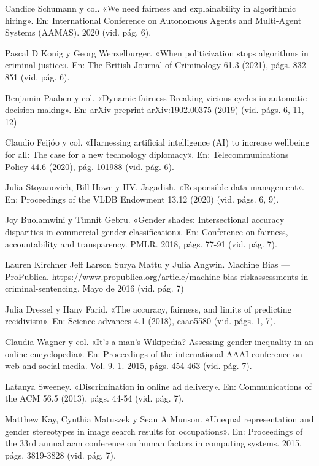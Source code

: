 \documentclass[runningheads,a4paper]{llncs}
\begin{document}
\begin{thebibliography}{99}
 Candice Schumann y col. «We need fairness and explainability in algorithmic
hiring». En: International Conference on Autonomous Agents and Multi-Agent
Systems (AAMAS). 2020 (vid. p\'ag. 6).

 Pascal D Konig y Georg Wenzelburger. «When politicization stops algorithms in
criminal justice». En: The British Journal of Criminology 61.3 (2021), p\'ags. 832-851
(vid. p\'ag. 6).

Benjamin Paaben y col. «Dynamic fairness-Breaking vicious cycles in automatic
decision making». En: arXiv preprint arXiv:1902.00375 (2019) (vid. p\'ags. 6, 11,
12)

 Claudio Feij\'oo y col. «Harnessing artificial intelligence (AI) to increase wellbeing
for all: The case for a new technology diplomacy». En: Telecommunications
Policy 44.6 (2020), p\'ag. 101988 (vid. p\'ag. 6).

 Julia Stoyanovich, Bill Howe y HV. Jagadish. «Responsible data management».
En: Proceedings of the VLDB Endowment 13.12 (2020) (vid. p\'ags. 6, 9).

 Joy Buolamwini y Timnit Gebru. «Gender shades: Intersectional accuracy disparities in commercial gender classification». En: Conference on fairness, accountability and transparency. PMLR. 2018, p\'ags. 77-91 (vid. p\'ag. 7).

Lauren Kirchner Jeff Larson Surya Mattu y Julia Angwin. Machine Bias —
ProPublica. https://www.propublica.org/article/machine-bias-riskassessments-in-criminal-sentencing. Mayo de
2016 (vid. p\'ag. 7)

Julia Dressel y Hany Farid. «The accuracy, fairness, and limits of predicting
recidivism». En: Science advances 4.1 (2018), eaao5580 (vid. p\'ags. 1, 7).

Claudia Wagner y col. «It’s a man’s Wikipedia? Assessing gender inequality in
an online encyclopedia». En: Proceedings of the international AAAI conference
on web and social media. Vol. 9. 1. 2015, p\'ags. 454-463 (vid. p\'ag. 7).

Latanya Sweeney. «Discrimination in online ad delivery». En: Communications
of the ACM 56.5 (2013), p\'ags. 44-54 (vid. p\'ag. 7).

 Matthew Kay, Cynthia Matuszek y Sean A Munson. «Unequal representation
and gender stereotypes in image search results for occupations». En: Proceedings
of the 33rd annual acm conference on human factors in computing systems.
2015, p\'ags. 3819-3828 (vid. p\'ag. 7).


\end{thebibliography}
\end{document}
